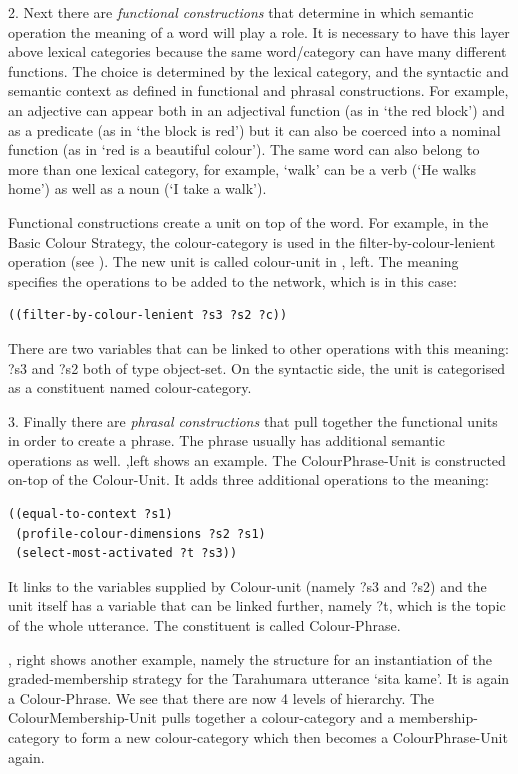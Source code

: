 2. Next there are {\itshape functional constructions} that determine in which semantic operation the meaning of a word 
will play a role. It is necessary to have this layer above lexical categories because the same word/category can have many 
different functions. The choice is determined by the lexical category, and the syntactic and semantic context as 
defined in functional and phrasal constructions. For example, an adjective can appear both in an adjectival 
function (as in `the red block') and as a predicate (as in `the block is red') but it can also be coerced 
into a nominal function (as in `red is a beautiful colour'). The same word can also belong to more than one 
lexical category, for example, `walk' can be a verb (`He walks home') as well as a noun (`I take a walk'). 

Functional constructions create a unit on top of the word. For example, in the Basic Colour Strategy, 
the colour-category is used in the filter-by-colour-lenient operation (see ). 
The new unit is called colour-unit in , left. 
The meaning specifies the operations to be added to the network, which is in this case: 
\begin{verbatim}
((filter-by-colour-lenient ?s3 ?s2 ?c))
\end{verbatim}
There are two variables that can be linked to other operations with this meaning: ?s3 and ?s2 both of type object-set. 
On the syntactic side, the unit is categorised as a constituent named colour-category. 

3. Finally there are {\itshape phrasal constructions} that pull together the functional units in order to create a phrase. 
The phrase usually has additional semantic operations as well. ,left shows an example. 
The ColourPhrase-Unit is constructed on-top of the Colour-Unit. It adds three additional operations to the meaning: 
\begin{verbatim}
((equal-to-context ?s1)
 (profile-colour-dimensions ?s2 ?s1)
 (select-most-activated ?t ?s3))
\end{verbatim}
It links to the variables supplied by Colour-unit (namely ?s3 and ?s2) and the unit itself has a variable that can 
be linked further, namely ?t, which is the topic of the whole utterance. 
The constituent is called Colour-Phrase. 

, right shows another example, namely the structure for an instantiation of the 
graded-membership strategy for the Tarahumara utterance `sita kame'. It is again a Colour-Phrase.
We see that there are now 4 levels of hierarchy. The ColourMembership-Unit pulls together a colour-category and 
a membership-category to form a new colour-category which then becomes a ColourPhrase-Unit again.
